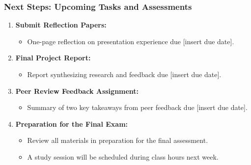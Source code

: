 \documentclass[aspectratio=169]{beamer}
\begin{document}
\begin{frame}[fragile]
    \frametitle{Next Steps: Upcoming Tasks and Assessments}

    \begin{enumerate}
        \item \textbf{Submit Reflection Papers:}
            \begin{itemize}
                \item One-page reflection on presentation experience due [insert due date].
            \end{itemize}
        
        \item \textbf{Final Project Report:}
            \begin{itemize}
                \item Report synthesizing research and feedback due [insert due date].
            \end{itemize}
        
        \item \textbf{Peer Review Feedback Assignment:}
            \begin{itemize}
                \item Summary of two key takeaways from peer feedback due [insert due date].
            \end{itemize}
        
        \item \textbf{Preparation for the Final Exam:}
            \begin{itemize}
                \item Review all materials in preparation for the final assessment.
                \item A study session will be scheduled during class hours next week.
            \end{itemize}
    \end{enumerate}
\end{frame}
\end{document}

